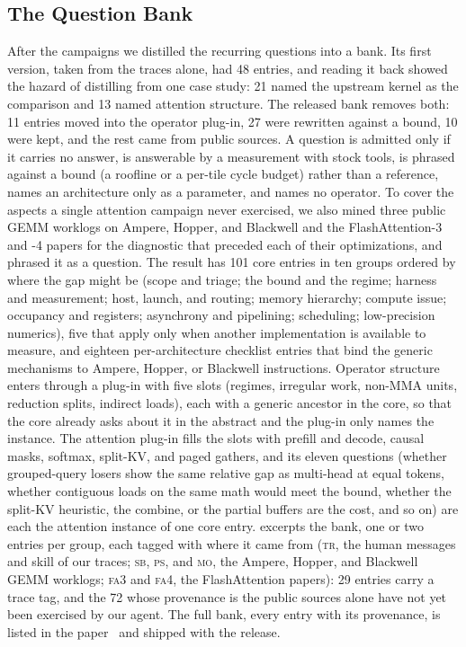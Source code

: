 \subsection{The Question Bank}
\label{kernelseek:sec:workflow-bank}

After the campaigns we distilled the recurring questions into a bank. Its first version, taken from
the traces alone, had 48 entries, and reading it back showed the hazard of distilling from one case
study: 21 named the upstream kernel as the comparison and 13 named attention structure. The released
bank removes both: 11 entries moved into the operator plug-in, 27 were rewritten against a bound,
10 were kept, and the rest came from public sources. A question is admitted only if it carries no answer, is answerable by a
measurement with stock tools, is phrased against a bound (a roofline or a per-tile cycle budget)
rather than a reference, names an architecture only as a parameter, and names no operator. To cover
the aspects a single attention campaign never exercised, we also mined three public GEMM worklogs on
Ampere, Hopper, and Blackwell \cite{boehm2022cudammm,shankhdhar2024h100,modular2025blackwell} and
the FlashAttention-3 and -4 papers \cite{shah2024flashattention3,zadouri2026flashattention4} for
the diagnostic that preceded each of their optimizations, and phrased it as a question. The result
has 101 core entries in ten groups ordered by where the gap might be (scope and triage; the bound
and the regime; harness and measurement; host, launch, and routing; memory hierarchy; compute issue;
occupancy and registers; asynchrony and pipelining; scheduling; low-precision numerics), five that
apply only when another implementation is available to measure, and eighteen per-architecture
checklist entries that bind the generic mechanisms to Ampere, Hopper, or Blackwell instructions.
Operator structure enters through a plug-in with five slots (regimes, irregular work, non-MMA
units, reduction splits, indirect loads), each with a generic ancestor in the core, so that the core
already asks about it in the abstract and the plug-in only names the instance. The attention plug-in
fills the slots with prefill and decode, causal masks, softmax, split-KV, and paged gathers, and its
eleven questions (whether grouped-query losers show the same relative gap as multi-head at equal
tokens, whether contiguous loads on the same math would meet the bound, whether the split-KV
heuristic, the combine, or the partial buffers are the cost, and so on) are each the attention
instance of one core entry.  excerpts the bank, one or two entries per
group, each tagged with where it came from (\textsc{tr}, the human messages and skill of our
traces; \textsc{sb}, \textsc{ps}, and \textsc{mo}, the Ampere, Hopper, and Blackwell GEMM worklogs;
\textsc{fa3} and \textsc{fa4}, the FlashAttention papers): 29 entries carry a trace tag, and the 72
whose provenance is the public sources alone have not yet been exercised by our agent. The full bank,
every entry with its provenance, is listed in the paper~\cite{kernelseek} and shipped with the
release.

